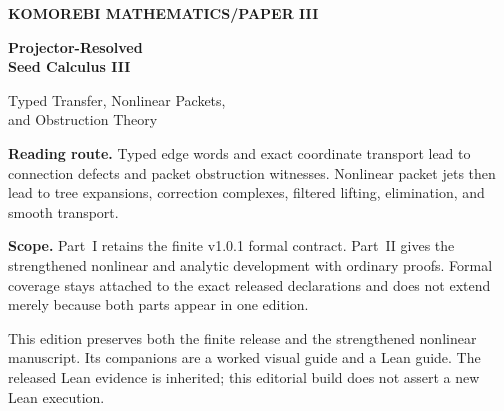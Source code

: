 \documentclass[11pt,a4paper]{article}
\theoremstyle{plain}
\theoremstyle{definition}
\theoremstyle{remark}
\begin{document}
\begin{titlepage}\thispagestyle{empty}
\vspace*{13mm}
{\sffamily\bfseries\color{accent}\large KOMOREBI MATHEMATICS\quad /\quad PAPER III\par}
\vspace{12mm}
{\sffamily\bfseries\fontsize{29}{34}\selectfont Projector-Resolved\\Seed Calculus III\par}
\vspace{8mm}
{\sffamily\fontsize{18}{23}\selectfont Typed Transfer, Nonlinear Packets,\\and Obstruction Theory\par}
\vspace{12mm}{\large Komorebi P.\par}
\vfill
\noindent\begin{minipage}{.94\linewidth}
\textbf{Reading route.} Typed edge words and exact coordinate transport lead to connection defects and packet obstruction witnesses. Nonlinear packet jets then lead to tree expansions, correction complexes, filtered lifting, elimination, and smooth transport.

\medskip
\textbf{Scope.} Part~I retains the finite v1.0.1 formal contract. Part~II gives the strengthened nonlinear and analytic development with ordinary proofs. Formal coverage stays attached to the exact released declarations and does not extend merely because both parts appear in one edition.
\end{minipage}
\vspace{13mm}
\end{titlepage}
\begin{abstract}
Finite projector packets turn linear transfer into typed walks and arbitrary maps into exact coordinate representations. We separate canonical coordinate transport, which satisfies an exact cocycle law, from a chosen connection, whose failure to compose produces holonomy and packet obstruction witnesses. We then develop nonlinear packet jets and higher composition, convergent rooted tree expansions, graded operations, and nonlinear refinement defects. A specified correction map produces a canonical cokernel obstruction. Relative exact sequences, mapping cones, Hilbert splitting, nonlinear correction, and filtered lifting describe how these obstructions behave. Exact elimination produces Schur formulas, and finite transport reduces gluing to fundamental cycle holonomy. For smooth orthogonal packet families, direct packet rotations converge in operator norm to canonical unitary transport. The finite formal contract and the broader ordinary proof development are identified separately throughout.
\end{abstract}
\noindent This edition preserves both the finite release and the strengthened nonlinear manuscript. Its companions are a worked visual guide and a Lean guide. The released Lean evidence is inherited; this editorial build does not assert a new Lean execution.
\tableofcontents\listoffigures\clearpage
\end{document}
